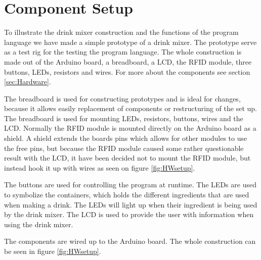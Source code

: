 \section{Component Setup}
To illustrate the drink mixer construction and the functions of the program language we have made a simple prototype of a drink mixer. The prototype serve as a test rig for the testing the program language. The whole construction is made out of the Arduino board, a breadboard, a LCD, the RFID module, three buttons, LEDs, resistors and wires. For more about the components see section \ref{sec:Hardware}.

The breadboard is used for constructing prototypes and is ideal for changes, because it allows easily replacement of components or restructuring of the set up. The breadboard is used for mounting LEDs, resistors, buttons, wires and the LCD.
Normally the RFID module is mounted directly on the Arduino board as a shield. A shield extends the boards pins which allows for other modules to use the free pins, but because the RFID module caused some rather questionable result with the LCD, it have been decided not to mount the RFID module, but instead hook it up with wires as seen on figure \ref{fig:HWsetup}.

The buttons are used for controlling the program at runtime. The LEDs are used to symbolize the containers, which holds the different ingredients that are used when making a drink. The LEDs will light up when their ingredient is being used by the drink mixer. The LCD is used to provide the user with information when using the drink mixer.


The components are wired up to the Arduino board. The whole construction can be seen in figure \ref{fig:HWsetup}.